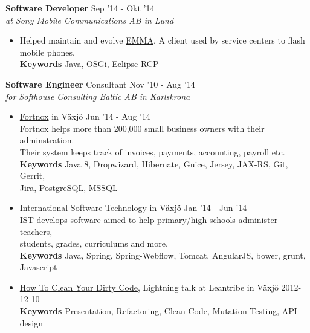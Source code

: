 \documentclass[overlapped]{res}
\begin{document}
\begin{resume}
{\bf Software Developer} \hfill Sep '14 - Okt '14 \\
{\sl at Sony Mobile Communications AB in Lund}
\begin{itemize}
\itemsep -1pt
\item Helped maintain and evolve \href{http://emma.extranet.sonyericsson.com/emma/}{EMMA}.  A client used by service centers to flash 
\\mobile phones.
\\{\bf Keywords} Java, OSGi, Eclipse RCP 
\end{itemize}

{\bf Software Engineer} Consultant \hfill Nov '10 - Aug '14 \\
{\sl for Softhouse Consulting Baltic AB in Karlskrona}
\begin{itemize}
\itemsep -1pt
\item \href{http://www.fortnox.se/}{Fortnox} in Växjö \hfill Jun '14 - Aug '14
\\Fortnox helps more than 200,000 small business owners with their adminstration. 
\\Their system keeps track of invoices, payments, accounting, payroll etc.
\\{\bf Keywords} Java 8, Dropwizard, Hibernate, Guice, Jersey, JAX-RS, Git, Gerrit, 
\\Jira, PostgreSQL, MSSQL
\\
\itemsep -1pt
\item International Software Technology in Växjö \hfill Jan '14 - Jun '14
\\IST develops software aimed to help primary/high schools administer teachers, 
\\students, grades, curriculums and more.
\\{\bf Keywords} Java, Spring, Spring-Webflow, Tomcat, AngularJS, bower, grunt, Javascript
\\
\item \href{http://www.youtube.com/watch?v=htalgZCFWMI}{How To Clean Your Dirty Code}, Lightning talk at Leantribe in Växjö \hfill 2012-12-10
\\{\bf Keywords} Presentation,  Refactoring,  Clean Code,  Mutation Testing,  API design


\end{itemize}
\end{resume}
\end{document}
